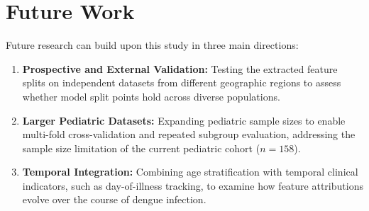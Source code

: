 \documentclass[12pt, a4paper]{report}
\begin{document}
\section{Future Work}
Future research can build upon this study in three main directions:
\begin{enumerate}
    \item \textbf{Prospective and External Validation:} Testing the extracted feature splits on independent datasets from different geographic regions to assess whether model split points hold across diverse populations.
    \item \textbf{Larger Pediatric Datasets:} Expanding pediatric sample sizes to enable multi-fold cross-validation and repeated subgroup evaluation, addressing the sample size limitation of the current pediatric cohort ($n=158$).
    \item \textbf{Temporal Integration:} Combining age stratification with temporal clinical indicators, such as day-of-illness tracking, to examine how feature attributions evolve over the course of dengue infection.
\end{enumerate}
\end{document}
